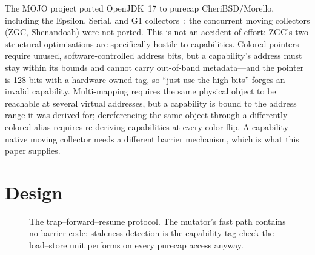 \documentclass[acmsmall,nonacm,screen]{acmart}
\begin{document}
The MOJO project ported OpenJDK~17 to purecap CheriBSD/Morello,
including the Epsilon, Serial, and G1 collectors~\cite{mojo-jvm}; the
concurrent moving collectors (ZGC, Shenandoah) were not ported. This is
not an accident of effort: ZGC's two structural optimisations are
specifically hostile to capabilities. Colored pointers require unused,
software-controlled address bits, but a capability's address must stay
within its bounds and cannot carry out-of-band metadata---and the
pointer is 128 bits with a hardware-owned tag, so ``just use the high
bits'' forges an invalid capability. Multi-mapping requires the same
physical object to be reachable at several virtual addresses, but a
capability is bound to the address range it was derived for;
dereferencing the same object through a differently-colored alias
requires re-deriving capabilities at every color flip. A
capability-native moving collector needs a different barrier
mechanism, which is what this paper supplies.

\section{Design}
\label{sec:design}

\begin{figure}
\centering
{}
\caption{The trap--forward--resume protocol. The mutator's fast path
contains no barrier code: staleness detection is the capability tag
check the load--store unit performs on every purecap access anyway.}
\label{fig:protocol}
\end{figure}
\end{document}
